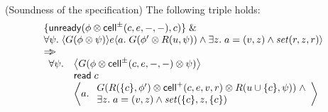 \begin{prop*}{(Soundness of the  specification)}
The following triple holds:
\begin{displaymath}
\begin{array}{l}
\{{\mathsf{unready}({\phi \otimes \mathsf{cell}^{\pm}({c}, {e}, {-}, {-})}, {c})}\} \;\&\; \\
\forall \psi.\; \langle{G(\phi \otimes \psi)}\rangle{e}\langle{a}.\;{G(\phi' \otimes R(u, \psi)) \land \exists z.\; a = (v, z) \land \mathit{set}(r, z, r)}\rangle \\
\Rightarrow\!\!\!> \\
\begin{array}{ll}
 \forall \psi. & \left<G(\phi \otimes \mathsf{cell}^{\pm}({c}, {e}, {-}, {-}) \otimes \psi)\right> \\
               & \mathsf{read}\; c \\
               & \left<a.\; 
                   \begin{array}{l}
                     G(R(\{{c}\}, \phi') \otimes \mathsf{cell}^{+}({c}, {e}, {v}, {r}) \otimes R(u \cup \{{c}\}, \psi)) 
                      \;\land \\
                      \exists z.\;a = (v, z) \land \mathit{set}(\{{c}\}, z, \{{c}\})
                   \end{array}\right> 
\end{array}
\end{array}
\end{displaymath}
\end{prop*}

